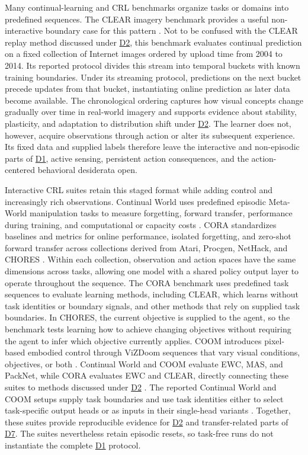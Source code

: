 \documentclass[10pt,journal,compsoc]{IEEEtran}
\DeclareRobustCommand{\Dref}[1]{\hyperref[sec:d#1]{D#1}}
\begin{document}
Many continual-learning and CRL benchmarks organize tasks or domains into predefined sequences.
The CLEAR imagery benchmark provides a useful non-interactive boundary case for this pattern \cite{lin2021}.
Not to be confused with the CLEAR replay method discussed under \Dref{2}, this benchmark evaluates continual prediction on a fixed collection of Internet images ordered by upload time from 2004 to 2014.
Its reported protocol divides this stream into temporal buckets with known training boundaries.
Under its streaming protocol, predictions on the next bucket precede updates from that bucket, instantiating online prediction as later data become available.
The chronological ordering captures how visual concepts change gradually over time in real-world imagery and supports evidence about stability, plasticity, and adaptation to distribution shift under \Dref{2}.
The learner does not, however, acquire observations through action or alter its subsequent experience.
Its fixed data and supplied labels therefore leave the interactive and non-episodic parts of \Dref{1}, active sensing, persistent action consequences, and the action-centered behavioral desiderata open.

Interactive CRL suites retain this staged format while adding control and increasingly rich observations.
Continual World uses predefined episodic Meta-World manipulation tasks to measure forgetting, forward transfer, performance during training, and computational or capacity costs \cite{wolczyk2021}.
CORA standardizes baselines and metrics for online performance, isolated forgetting, and zero-shot forward transfer across collections derived from Atari, Procgen, NetHack, and CHORES \cite{powers2022}.
Within each collection, observation and action spaces have the same dimensions across tasks, allowing one model with a shared policy output layer to operate throughout the sequence.
The CORA benchmark uses predefined task sequences to evaluate learning methods, including CLEAR, which learns without task identities or boundary signals, and other methods that rely on supplied task boundaries.
In CHORES, the current objective is supplied to the agent, so the benchmark tests learning how to achieve changing objectives without requiring the agent to infer which objective currently applies.
COOM introduces pixel-based embodied control through ViZDoom sequences that vary visual conditions, objectives, or both \cite{tomilin2023}.
Continual World and COOM evaluate EWC, MAS, and PackNet, while CORA evaluates EWC and CLEAR, directly connecting these suites to methods discussed under \Dref{2} \cite{wolczyk2021,powers2022,tomilin2023}.
The reported Continual World and COOM setups supply task boundaries and use task identities either to select task-specific output heads or as inputs in their single-head variants \cite{wolczyk2021,tomilin2023}.
Together, these suites provide reproducible evidence for \Dref{2} and transfer-related parts of \Dref{7}.
The suites nevertheless retain episodic resets, so task-free runs do not instantiate the complete \Dref{1} protocol.
\end{document}
